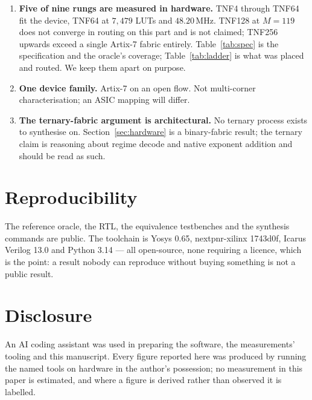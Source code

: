 \documentclass[11pt]{article}
\theoremstyle{definition}
\begin{document}
\begin{enumerate}[leftmargin=*]
\item \textbf{Five of nine rungs are measured in hardware.} TNF4 through TNF64 fit
the device, TNF64 at $7{,}479$ LUTs and $48.20$\,MHz. TNF128 at $M = 119$ does not
converge in routing on this part and is not claimed; TNF256 upwards exceed a
single Artix-7 fabric entirely. Table~\ref{tab:spec} is the
specification and the oracle's coverage; Table~\ref{tab:ladder} is what was
placed and routed. We keep them apart on purpose.

\item \textbf{One device family.} Artix-7 on an open flow. Not multi-corner
characterisation; an ASIC mapping will differ.

\item \textbf{The ternary-fabric argument is architectural.} No ternary process
exists to synthesise on. Section~\ref{sec:hardware} is a binary-fabric result;
the ternary claim is reasoning about regime decode and native exponent addition
and should be read as such.
\end{enumerate}

\section*{Reproducibility}

The reference oracle, the RTL, the equivalence testbenches and the synthesis
commands are public. The toolchain is Yosys 0.65, nextpnr-xilinx 1743d0f,
Icarus Verilog 13.0 and Python 3.14 --- all open-source, none requiring a
licence, which is the point: a result nobody can reproduce without buying
something is not a public result.

\section*{Disclosure}

An AI coding assistant was used in preparing the software, the measurements'
tooling and this manuscript. Every figure reported here was produced by running
the named tools on hardware in the author's possession; no measurement in this
paper is estimated, and where a figure is derived rather than observed it is
labelled.
\end{document}
